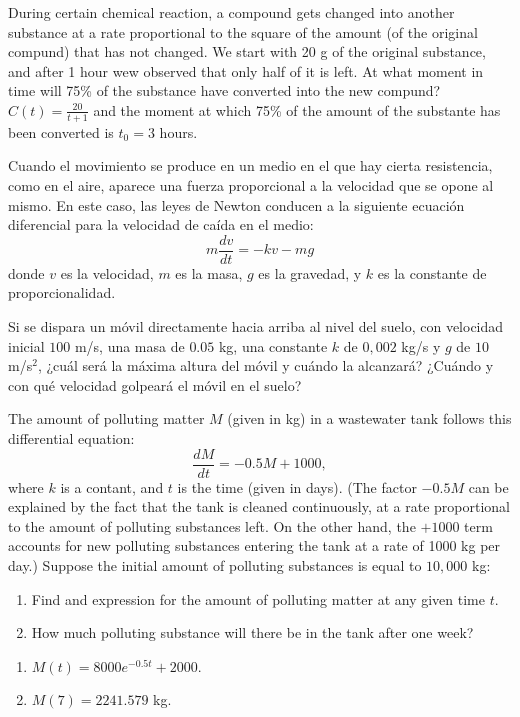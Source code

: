 {During certain chemical reaction, a compound gets changed into another substance at a rate proportional to the square of the amount (of the original compund) that has not changed.
We start with 20 g of the original substance, and after 1 hour wew observed that only half of it is left.
At what moment in time will 75\% of the substance have converted into the new compund?}
{$C(t)=\frac{20}{t+1}$ and the moment at which 75\% of the amount of the substante has been converted is  $t_0=3$ hours.
}
{}


{Cuando el movimiento se produce en un medio en el que hay cierta resistencia, como en el aire, aparece una fuerza
proporcional a la velocidad que se opone al mismo. En este caso, las leyes de Newton conducen a la siguiente ecuación
diferencial para la velocidad de caída en el medio:
\[
m\frac{{dv}} {{dt}} =  - kv - mg
\]
donde $v$ es la velocidad, $m$ es la masa, $g$ es la gravedad, y $k$ es la constante de proporcionalidad.

Si se dispara un móvil directamente hacia arriba al nivel del suelo, con velocidad inicial $100$ m/s, una masa de
$0.05$ kg, una constante $k$ de $0,002$ kg/s y $g$ de $10$ m/s$^2$, ¿cuál será la máxima altura del móvil y cuándo la
alcanzará? ¿Cuándo y con qué velocidad golpeará el móvil en el suelo?}
{
}
{}


{The amount of polluting matter $M$ (given in kg) in a wastewater tank follows this differential equation:
\[
\frac{dM}{dt}=-0.5M+1000,
\]
where $k$ is a contant, and $t$ is the time (given in days).
(The factor $-0.5M$ can be explained by the fact that the tank is cleaned continuously,
at a rate proportional to the amount of polluting substances left.
On the other hand, the $+1000$ term accounts for new polluting substances entering the tank at a rate of 1000 kg per day.)
Suppose the initial amount of polluting substances is equal to $10,000$ kg:
\begin{enumerate}
\item Find and expression for the amount of polluting matter at any given time $t$.
\item How much polluting substance will there be in the tank after one week?
\end{enumerate}
}
{\begin{enumerate}
\item $M(t)=8000e^{-0.5t}+2000$.
\item $M(7)=2241.579$ kg.
\end{enumerate}
}
{}



